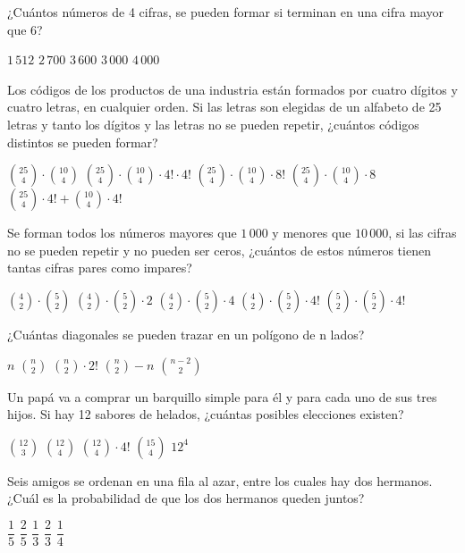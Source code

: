 \documentclass[sin nombre]{srs}
\begin{document}
\begin{preguntas}[after-item-skip=2cm]
\pregunta ¿Cuántos números de 4 cifras, se pueden formar si terminan en una cifra mayor que 6?
\begin{vertical}
\alternativa $1\,512$
\alternativa $2\,700$
\alternativa $3\,600$
\alternativa $3\,000$
\alternativa $4\,000$
\end{vertical}

\pregunta Los códigos de los productos de una industria están formados por cuatro dígitos y cuatro letras, en cualquier orden. Si las letras son elegidas de un alfabeto de 25 letras y tanto los dígitos y las letras no se pueden repetir, ¿cuántos códigos distintos se pueden formar?
\begin{vertical}
\alternativa $\binom{25}{4} \cdot \binom{10}{4}$
\alternativa $\binom{25}{4} \cdot \binom{10}{4} \cdot 4! \cdot 4!$
\alternativa $\binom{25}{4} \cdot \binom{10}{4} \cdot 8!$
\alternativa $\binom{25}{4} \cdot \binom{10}{4} \cdot 8$
\alternativa $\binom{25}{4} \cdot 4! + \binom{10}{4} \cdot 4!$
\end{vertical}

\pregunta Se forman todos los números mayores que $1\,000$ y menores que $10\,000$, si las cifras no se pueden repetir y no pueden ser ceros, ¿cuántos de estos números tienen tantas cifras pares como impares?
\begin{vertical}
\alternativa $\binom{4}{2} \cdot \binom{5}{2}$
\alternativa $\binom{4}{2} \cdot \binom{5}{2} \cdot 2$
\alternativa $\binom{4}{2} \cdot \binom{5}{2} \cdot 4$
\alternativa $\binom{4}{2} \cdot \binom{5}{2} \cdot 4!$
\alternativa $\binom{5}{2} \cdot \binom{5}{2} \cdot 4!$
\end{vertical}

\pregunta ¿Cuántas diagonales se pueden trazar en un polígono de n lados?
\begin{vertical}
\alternativa $n$
\alternativa $\binom{n}{2}$
\alternativa $\binom{n}{2} \cdot 2!$
\alternativa $\binom{n}{2} - n$
\alternativa $\binom{n - 2}{2}$
\end{vertical}

\pregunta Un papá va a comprar un barquillo simple para él y para cada uno de sus tres hijos. Si hay 12 sabores de helados, ¿cuántas posibles elecciones existen?
\begin{vertical}
\alternativa $\binom{12}{3}$
\alternativa $\binom{12}{4}$
\alternativa $\binom{12}{4} \cdot 4!$
\alternativa $\binom{15}{4}$
\alternativa $12^4$
\end{vertical}

\pregunta Seis amigos se ordenan en una fila al azar, entre los cuales hay dos hermanos. ¿Cuál es la probabilidad de que los dos hermanos queden juntos?
\begin{vertical}
\alternativa $\dfrac{1}{5}$
\alternativa $\dfrac{2}{5}$
\alternativa $\dfrac{1}{3}$
\alternativa $\dfrac{2}{3}$
\alternativa $\dfrac{1}{4}$
\end{vertical}


\end{preguntas}
\end{document}
